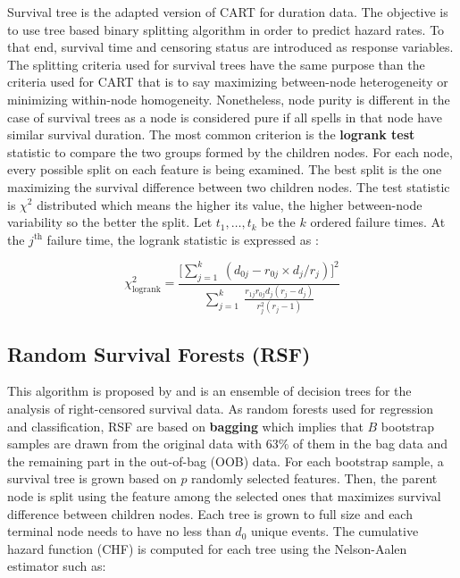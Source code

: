 \documentclass[
]{book}
\begin{document}
Survival tree \citep{SURV_TREE} is the adapted version of CART for duration data. The objective is to use tree based binary splitting algorithm in order to predict hazard rates. To that end, survival time and censoring status are introduced as response variables. The splitting criteria used for survival trees have the same purpose than the criteria used for CART that is to say maximizing between-node heterogeneity or minimizing within-node homogeneity. Nonetheless, node purity is different in the case of survival trees as a node is considered pure if all spells in that node have similar survival duration. The most common criterion is the \textbf{logrank test} statistic to compare the two groups formed by the children nodes. For each node, every possible split on each feature is being examined. The best split is the one maximizing the survival difference between two children nodes. The test statistic is \(\chi^2\) distributed which means the higher its value, the higher between-node variability so the better the split. Let \(t_1, \dots, t_k\) be the \(k\) ordered failure times. At the \(j^{\text{th}}\) failure time, the logrank statistic is expressed as \citep{SEGAL}:

\begin{equation}
  \chi^2_{\text{logrank}} = \frac{\big[\sum_{j=1}^k \ (d_{0j} - r_{0j} \times d_j/r_j) \big]^2}{\sum_{j=1}^k \ \frac{r_{1j}r_{0j}d_j(r_j - d_j)}{r_j^2(r_j -1)}}
  \label{eq:logrank}
\end{equation}

\hypertarget{random-survival-forests-rsf}{%
\subsection{Random Survival Forests (RSF)}\label{random-survival-forests-rsf}}

This algorithm is proposed by \citet{RSF} and is an ensemble of decision trees for the analysis of right-censored survival data. As random forests used for regression and classification, RSF are based on \textbf{bagging} which implies that \(B\) bootstrap samples are drawn from the original data with 63\(\%\) of them in the bag data and the remaining part in the out-of-bag (OOB) data. For each bootstrap sample, a survival tree is grown based on \(p\) randomly selected features. Then, the parent node is split using the feature among the selected ones that maximizes survival difference between children nodes. Each tree is grown to full size and each terminal node needs to have no less than \(d_0\) unique events. The cumulative hazard function (CHF) is computed for each tree using the Nelson-Aalen estimator such as:
\end{document}

